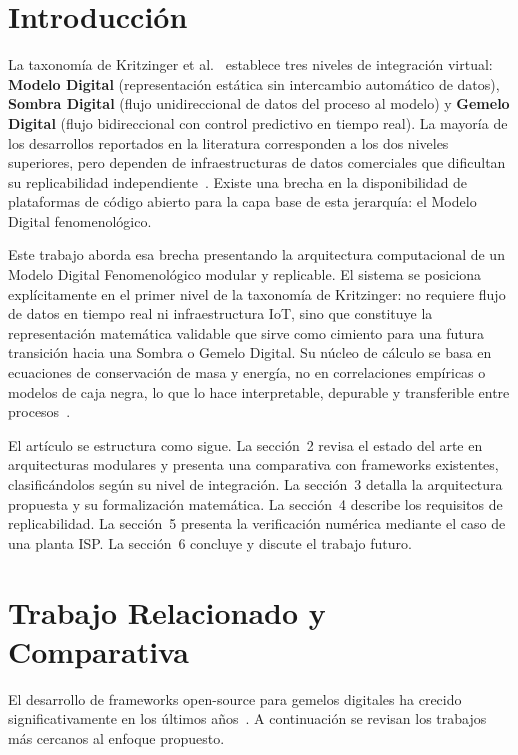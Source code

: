 \documentclass[10pt,letterpaper,twocolumn]{article}
\begin{document}
\section{Introducción}

La taxonomía de Kritzinger et al.~\cite{kritzinger2018digital} establece tres niveles de integración virtual: \textbf{Modelo Digital} (representación estática sin intercambio automático de datos), \textbf{Sombra Digital} (flujo unidireccional de datos del proceso al modelo) y \textbf{Gemelo Digital} (flujo bidireccional con control predictivo en tiempo real). La mayoría de los desarrollos reportados en la literatura corresponden a los dos niveles superiores, pero dependen de infraestructuras de datos comerciales que dificultan su replicabilidad independiente~\cite{gil2024survey}. Existe una brecha en la disponibilidad de plataformas de código abierto para la capa base de esta jerarqu\'ia: el Modelo Digital fenomenológico.

Este trabajo aborda esa brecha presentando la arquitectura computacional de un Modelo Digital Fenomenológico modular y replicable. El sistema se posiciona explícitamente en el primer nivel de la taxonom\'ia de Kritzinger: no requiere flujo de datos en tiempo real ni infraestructura IoT, sino que constituye la representaci\'on matem\'atica validable que sirve como cimiento para una futura transici\'on hacia una Sombra o Gemelo Digital. Su núcleo de cálculo se basa en ecuaciones de conservación de masa y energía, no en correlaciones empíricas o modelos de caja negra, lo que lo hace interpretable, depurable y transferible entre procesos~\cite{perry2019}.

El art\'iculo se estructura como sigue. La secci\'on~2 revisa el estado del arte en arquitecturas modulares y presenta una comparativa con frameworks existentes, clasific\'andolos seg\'un su nivel de integraci\'on. La secci\'on~3 detalla la arquitectura propuesta y su formalizaci\'on matem\'atica. La secci\'on~4 describe los requisitos de replicabilidad. La secci\'on~5 presenta la verificaci\'on num\'erica mediante el caso de una planta ISP. La secci\'on~6 concluye y discute el trabajo futuro.

\section{Trabajo Relacionado y Comparativa}

El desarrollo de frameworks open-source para gemelos digitales ha crecido significativamente en los últimos años~\cite{gil2024survey}. A continuación se revisan los trabajos más cercanos al enfoque propuesto.
\end{document}
